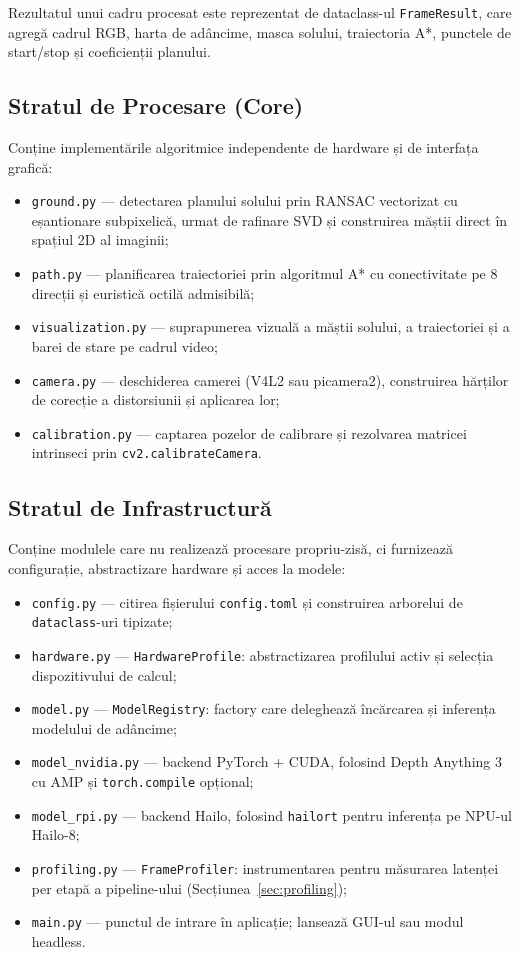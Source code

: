 Rezultatul unui cadru procesat este reprezentat de dataclass-ul \texttt{FrameResult}, care agregă cadrul RGB, harta de adâncime, masca solului, traiectoria A*, punctele de start/stop și coeficienții planului.

\subsection{Stratul de Procesare (Core)}

Conține implementările algoritmice independente de hardware și de interfața grafică:
\begin{itemize}
    \item \texttt{ground.py} — detectarea planului solului prin RANSAC vectorizat cu eșantionare subpixelică, urmat de rafinare SVD și construirea măștii direct în spațiul 2D al imaginii;
    \item \texttt{path.py} — planificarea traiectoriei prin algoritmul A* cu conectivitate pe 8 direcții și euristică octilă admisibilă;
    \item \texttt{visualization.py} — suprapunerea vizuală a măștii solului, a traiectoriei și a barei de stare pe cadrul video;
    \item \texttt{camera.py} — deschiderea camerei (V4L2 sau picamera2), construirea hărților de corecție a distorsiunii și aplicarea lor;
    \item \texttt{calibration.py} — captarea pozelor de calibrare și rezolvarea matricei intrinseci prin \texttt{cv2.calibrateCamera}.
\end{itemize}

\subsection{Stratul de Infrastructură}

Conține modulele care nu realizează procesare propriu-zisă, ci furnizează configurație, abstractizare hardware și acces la modele:
\begin{itemize}
    \item \texttt{config.py} — citirea fișierului \texttt{config.toml} și construirea arborelui de \texttt{dataclass}-uri tipizate;
    \item \texttt{hardware.py} — \texttt{HardwareProfile}: abstractizarea profilului activ și selecția dispozitivului de calcul;
    \item \texttt{model.py} — \texttt{ModelRegistry}: factory care deleghează încărcarea și inferența modelului de adâncime;
    \item \texttt{model\_nvidia.py} — backend PyTorch + CUDA, folosind Depth Anything 3 cu AMP și \texttt{torch.compile} opțional;
    \item \texttt{model\_rpi.py} — backend Hailo, folosind \texttt{hailort} pentru inferența pe NPU-ul Hailo-8;
    \item \texttt{profiling.py} — \texttt{FrameProfiler}: instrumentarea pentru măsurarea latenței per etapă a pipeline-ului (Secțiunea~\ref{sec:profiling});
    \item \texttt{main.py} — punctul de intrare în aplicație; lansează GUI-ul sau modul headless.
\end{itemize}

